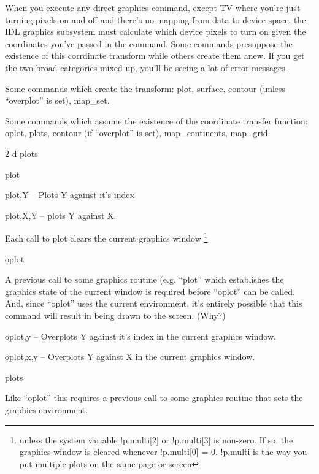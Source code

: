 \documentclass{article}
\begin{document}
  When you execute any direct graphics command, except TV where
  you're just turning pixels on and off and there's no mapping from
  data to device space, the IDL graphics subsystem must calculate
  which device pixels to turn on given the coordinates you've passed
  in the command. Some commands presuppose the existence of this
  corrdinate transform while others create them anew. If you get the
  two broad categories mixed up, you'll be seeing a lot of error
  messages.

  Some commands which create the transform: plot, surface, contour
  (unless ``overplot'' is set), map\_set.

  Some commands which assume the existence of the coordinate transfer
  function: oplot, plots, contour (if ``overplot'' is set),
  map\_continents, map\_grid.


  \bi
    \item 2-d plots
   
	\bi 
	  \item plot

	    plot,Y -- Plots Y against it's index

	    plot,X,Y -- plots Y against X.
	    
	    Each call to plot clears the current graphics window
            \footnote{unless the system variable !p.multi[2] or !p.multi[3]  is
            non-zero. If so, the graphics window is cleared whenever
            !p.multi[0] = 0. !p.multi is the way you put multiple
             plots on the same page or screen}

	  \item oplot 

            A previous call to some graphics routine (e.g. ``plot''
            which establishes the graphics state of the current window
            is required before ``oplot'' can be called. And, since
            ``oplot'' uses the current environment, it's entirely
            possible that this command will result in 
            being drawn to the 
	    screen. (Why?)

	      oplot,y -- Overplots Y against it's index in the
              current graphics window. 

	      oplot,x,y -- Overplots Y against X in the current graphics window. 

          \item plots

	    Like ``oplot'' this requires a previous call to some
            graphics routine that sets the graphics environment. 
\end{document}
